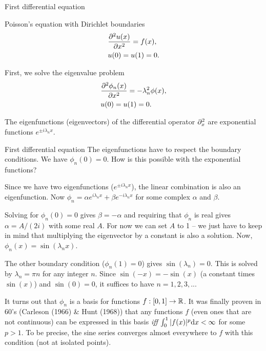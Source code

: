 
\begin{frame}{First differential equation}
	\begin{block}{\centering Poisson's equation with Dirichlet boundaries}
		 \begin{align*}
		 	&\pfrac[2]{u(x)}{x} = f(x), \\
		 	&u(0) = u(1) = 0.
		 \end{align*}
	\end{block}	
	
	\pause
	First, we solve the eigenvalue problem
	\begin{align*}
		&\pfrac[2]{\phi_n(x)}{x} = -\lambda_n^2 \phi(x), \\
		&u(0) = u(1) = 0.
	\end{align*}
	
	\pause
	The eigenfunctions (eigenvectors) of the differential operator $ \pp[2]{x} $ are exponential functions $e^{\pm i \lambda_n x} $. 
\end{frame}


\begin{frame}{First differential equation}
	The eigenfunctions  have to respect the boundary conditions. We have $ \phi_n(0) = 0 $. How is this possible with the exponential functions?
	
	\pause
	Since we have two eigenfunctions ($e^{\pm i \lambda_n x} $), the linear combination is also an eigenfunction. Now $ \phi_n = \alpha e^{ i \lambda_n x} + \beta e^{ -i \lambda_n x} $ for some complex $ \alpha $ and $ \beta $. 
	
	\pause
	Solving for $ \phi_n(0) = 0 $ gives $ \beta = -\alpha $ and requiring that $ \phi_n $ is real gives $ \alpha = A/(2i) $ with some real $ A $. For now we can set $ A $ to 1 -- we just have to keep in mind that multiplying the eigenvector by a constant is also a solution. Now, \alert{$ \phi_n(x) = \sin(\lambda_n x) $}. 
	
	\pause
	The other boundary condition ($ \phi_n (1) = 0 $) gives $ \sin(\lambda_n) = 0 $. This is solved by \alert{$ \lambda_n = \pi n$} for any integer $ n $. Since $ \sin(-x) =-\sin(x) $ (a constant times $ \sin(x) $) and $ \sin(0) = 0 $, it suffices to have $ n = 1,2,3,... $
	
	\pause
	It turns out that $ \phi_n $ is a \alert{basis} for functions $ f:[0,1] \to \R $. {\color{olive} It was finally proven in 60's (Carleson (1966) \& Hunt (1968)) that any functions $ f $ (even ones that are not continuous) can be expressed in this basis \textit{iff} $ \int_{0}^{1} |f(x)|^p \diff x < \infty $ for some $ p>1 $. To be precise, the sine series converges almost everywhere to $ f $ with this condition (not at isolated points).}
	
\end{frame}

